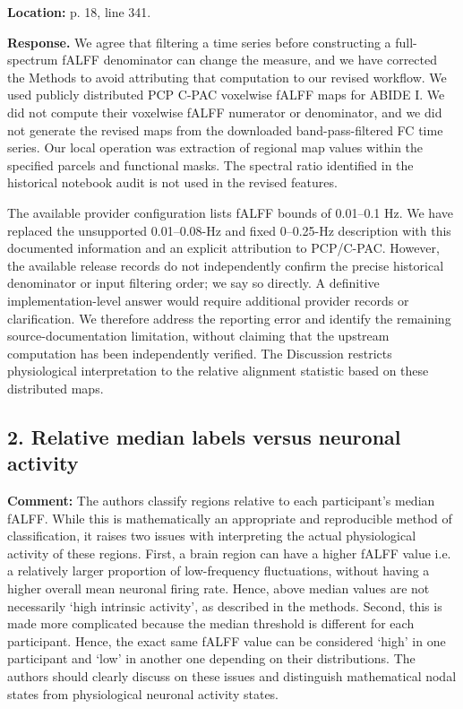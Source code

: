 \documentclass[11pt]{article}
\begin{document}
\textbf{Location:} p. 18, line 341.


 \textbf{Response.} We agree that filtering a time series before constructing a full-spectrum fALFF denominator can change the measure, and we have corrected the Methods to avoid attributing that computation to our revised workflow. We used publicly distributed PCP C-PAC voxelwise fALFF maps for ABIDE I. We did not compute their voxelwise fALFF numerator or denominator, and we did not generate the revised maps from the downloaded band-pass-filtered FC time series. Our local operation was extraction of regional map values within the specified parcels and functional masks. The spectral ratio identified in the historical notebook audit is not used in the revised features.


The available provider configuration lists fALFF bounds of 0.01--0.1 Hz. We have replaced the unsupported 0.01--0.08-Hz and fixed 0--0.25-Hz description with this documented information and an explicit attribution to PCP/C-PAC. However, the available release records do not independently confirm the precise historical denominator or input filtering order; we say so directly. A definitive implementation-level answer would require additional provider records or clarification. We therefore address the reporting error and identify the remaining source-documentation limitation, without claiming that the upstream computation has been independently verified. The Discussion restricts physiological interpretation to the relative alignment statistic based on these distributed maps.


\subsection*{2. Relative median labels versus neuronal activity}

\textbf{Comment:} The authors classify regions relative to each participant’s median fALFF. While this is mathematically an appropriate and reproducible method of classification, it raises two issues with interpreting the actual physiological activity of these regions. First, a brain region can have a higher fALFF value i.e. a relatively larger proportion of low-frequency fluctuations, without having a higher overall mean neuronal firing rate. Hence, above median values are not necessarily ‘high intrinsic activity’, as described in the methods. Second, this is made more complicated because the median threshold is different for each participant. Hence, the exact same fALFF value can be considered ‘high’ in one participant and ‘low’ in another one depending on their distributions. The authors should clearly discuss on these issues and distinguish mathematical nodal states from physiological neuronal activity states.
\end{document}
